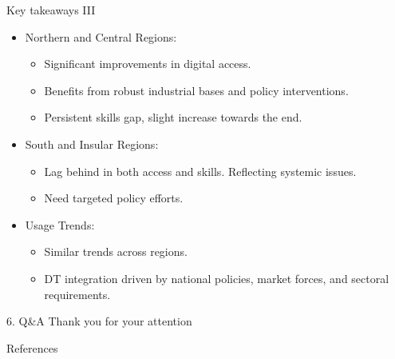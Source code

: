\documentclass[
  ignorenonframetext,
]{beamer}
\newif\ifbibliography
\providecommand{\tightlist}{%
  \setlength{\itemsep}{0pt}\setlength{\parskip}{0pt}}
\begin{document}
\begin{frame}{Key takeaways III}
\label{key-takeaways-iii}
\begin{itemize}
\item
  Northern and Central Regions:

  \begin{itemize}
  \tightlist
  \item
    Significant improvements in digital access.
  \item
    Benefits from robust industrial bases and policy interventions.
  \item
    Persistent skills gap, slight increase towards the end.
  \end{itemize}
\item
  South and Insular Regions:

  \begin{itemize}
  \tightlist
  \item
    Lag behind in both access and skills. Reflecting systemic issues.
  \item
    Need targeted policy efforts.
  \end{itemize}
\item
  Usage Trends:

  \begin{itemize}
  \tightlist
  \item
    Similar trends across regions.
  \item
    DT integration driven by national policies, market forces, and
    sectoral requirements.
  \end{itemize}
\end{itemize}
\end{frame}

\begin{frame}{6. Q\&A}
\label{qa}
Thank you for your attention
\end{frame}

\renewcommand\refname{References}
\begin{frame}[allowframebreaks]{References}
  \bibliographytrue
  
\end{frame}
\end{document}
